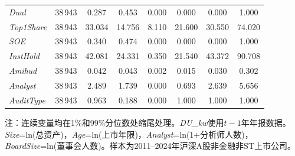 \documentclass[11pt,a4paper]{article}
\begin{document}
\begin{table}[htbp]
\begin{tabular}{l*{7}{c}}
\textit{Dual}        & 38\,943 & 0.287 & 0.453 & 0.000 & 0.000 & 0.000 & 1.000 \\
\textit{Top1Share}   & 38\,943 & 33.034 & 14.756 & 8.110 & 21.600 & 30.550 & 74.020 \\
\textit{SOE}         & 38\,943 & 0.340 & 0.474 & 0.000 & 0.000 & 0.000 & 1.000 \\
\textit{InstHold}    & 38\,943 & 42.081 & 24.331 & 0.350 & 21.540 & 43.372 & 90.708 \\
\textit{Amihud}      & 38\,943 & 0.042 & 0.043 & 0.002 & 0.015 & 0.030 & 0.302 \\
\textit{Analyst}     & 38\,943 & 2.489 & 1.739 & 0.000 & 0.693 & 2.639 & 5.656 \\
\textit{AuditType}   & 38\,943 & 0.963 & 0.188 & 0.000 & 1.000 & 1.000 & 1.000 \\
\bottomrule
\end{tabular}

\vspace{4pt}
{\footnotesize 注：连续变量均在1\%和99\%分位数处缩尾处理。\textit{DU\_kw}使用$t-1$年年报数据。\textit{Size}=ln(总资产)，\textit{Age}=ln(上市年限)，\textit{Analyst}=ln(1+分析师人数)，\textit{BoardSize}=ln(董事会人数)。样本为2011--2024年沪深A股非金融非ST上市公司。}
\end{table}


\FloatBarrier
\end{document}
